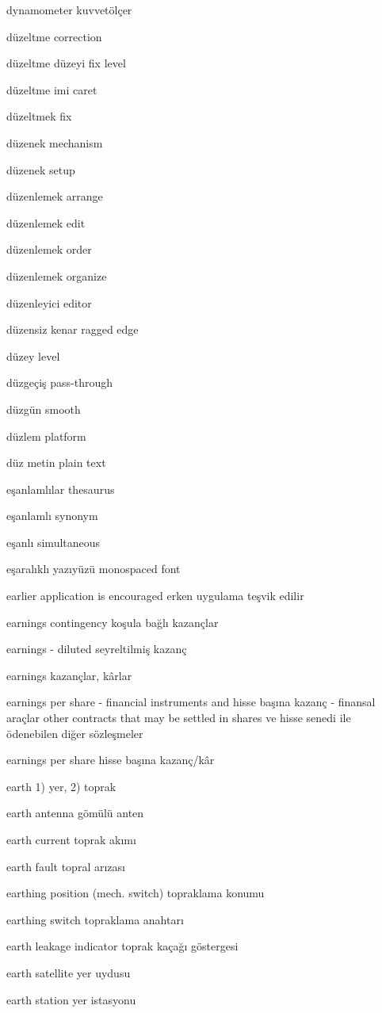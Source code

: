 \documentclass[12pt,fleqn]{article}\usepackage{../../common}
\begin{document}
dynamometer kuvvetölçer

düzeltme correction

düzeltme düzeyi fix level

düzeltme imi caret

düzeltmek fix

düzenek mechanism

düzenek setup

düzenlemek arrange

düzenlemek edit

düzenlemek order

düzenlemek organize

düzenleyici editor

düzensiz kenar ragged edge

düzey level

düzgeçiş pass-through

düzgün smooth

düzlem platform

düz metin plain text

eşanlamlılar thesaurus

eşanlamlı synonym

eşanlı simultaneous

eşaralıklı yazıyüzü monospaced font

earlier application is encouraged erken uygulama teşvik edilir

earnings contingency koşula bağlı kazançlar

earnings - diluted seyreltilmiş kazanç

earnings kazançlar, kârlar

earnings per share - financial instruments and hisse başına kazanç - finansal araçlar other contracts that may be settled in shares ve hisse senedi ile ödenebilen diğer sözleşmeler

earnings per share hisse başına kazanç/kâr

earth 1) yer, 2) toprak

earth antenna gömülü anten

earth current toprak akımı

earth fault topral arızası

earthing position (mech. switch) topraklama konumu

earthing switch topraklama anahtarı

earth leakage indicator toprak kaçağı göstergesi

earth satellite yer uydusu

earth station yer istasyonu
\end{document}
